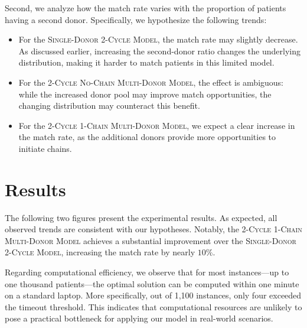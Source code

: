 Second, we analyze how the match rate varies with the proportion of patients having a second donor. Specifically, we hypothesize the following trends:
\begin{itemize}
\item For the \textsc{Single-Donor 2-Cycle Model}, the match rate may slightly decrease. As discussed earlier, increasing the second-donor ratio changes the underlying distribution, making it harder to match patients in this limited model.
\item For the \textsc{2-Cycle No-Chain Multi-Donor Model}, the effect is ambiguous: while the increased donor pool may improve match opportunities, the changing distribution may counteract this benefit.
\item For the \textsc{2-Cycle 1-Chain Multi-Donor Model}, we expect a clear increase in the match rate, as the additional donors provide more opportunities to initiate chains.
\end{itemize}



\section{Results}


The following two figures present the experimental results. As expected, all observed trends are consistent with our hypotheses. Notably, the \textsc{2-Cycle 1-Chain Multi-Donor Model} achieves a substantial improvement over the \textsc{Single-Donor 2-Cycle Model}, increasing the match rate by nearly $10\%$.

Regarding computational efficiency, we observe that for most instances—up to one thousand patients—the optimal solution can be computed within one minute on a standard laptop. More specifically, out of 1,100 instances, only four exceeded the timeout threshold. This indicates that computational resources are unlikely to pose a practical bottleneck for applying our model in real-world scenarios.


